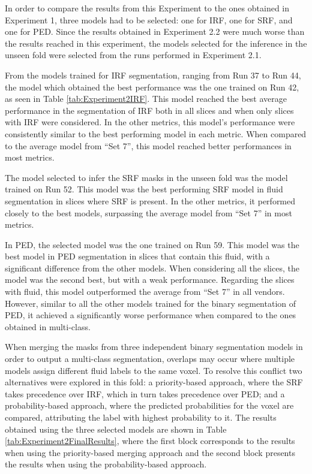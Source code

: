 \par
In order to compare the results from this Experiment to the ones obtained in Experiment 1, three models had to be selected: one for IRF, one for SRF, and one for PED. Since the results obtained in Experiment 2.2 were much worse than the results reached in this experiment, the models selected for the inference in the unseen fold were selected from the runs performed in Experiment 2.1.
\par
From the models trained for IRF segmentation, ranging from Run 37 to Run 44, the model which obtained the best performance was the one trained on Run 42, as seen in Table \ref{tab:Experiment2IRF}. This model reached the best average performance in the segmentation of IRF both in all slices and when only slices with IRF were considered. In the other metrics, this model's performance were consistently similar to the best performing model in each metric. When compared to the average model from ``Set 7'', this model reached better performances in most metrics.
\par
The model selected to infer the SRF masks in the unseen fold was the model trained on Run 52. This model was the best performing SRF model in fluid segmentation in slices where SRF is present. In the other metrics, it performed closely to the best models, surpassing the average model from ``Set 7'' in most metrics.
\par
In PED, the selected model was the one trained on Run 59. This model was the best model in PED segmentation in slices that contain this fluid, with a significant difference from the other models. When considering all the slices, the model was the second best, but with a weak performance. Regarding the slices with fluid, this model outperformed the average from ``Set 7'' in all vendors. However, similar to all the other models trained for the binary segmentation of PED, it achieved a significantly worse performance when compared to the ones obtained in multi-class.
\par
When merging the masks from three independent binary segmentation models in order to output a multi-class segmentation, overlaps may occur where multiple models assign different fluid labels to the same voxel. To resolve this conflict two alternatives were explored in this fold: a priority-based approach, where the SRF takes precedence over IRF, which in turn takes precedence over PED; and a probability-based approach, where the predicted probabilities for the voxel are compared, attributing the label with highest probability to it. The results obtained using the three selected models are shown in Table \ref{tab:Experiment2FinalResults}, where the first block corresponds to the results when using the priority-based merging approach and the second block presents the results when using the probability-based approach.

